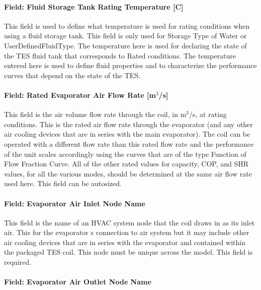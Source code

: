 \paragraph{Field: Fluid Storage Tank Rating Temperature {[}C{]}}\label{field-fluid-storage-tank-rating-temperature-c}

This field is used to define what temperature is used for rating conditions when using a fluid storage tank. This field is only used for Storage Type of Water or UserDefinedFluidType. The temperature here is used for declaring the state of the TES fluid tank that corresponds to Rated conditions. The temperature entered here is used to define fluid properties and to characterize the performance curves that depend on the state of the TES.

\paragraph{Field: Rated Evaporator Air Flow Rate {[}m\(^{3}\)/s{]}}\label{field-rated-evaporator-air-flow-rate-m3s}

This field is the air volume flow rate through the coil, in m\(^{3}\)/s, at rating conditions. This is the rated air flow rate through the evaporator (and any other air cooling devices that are in series with the main evaporator). The coil can be operated with a different flow rate than this rated flow rate and the performance of the unit scales accordingly using the curves that are of the type Function of Flow Fraction Curve. All of the other rated values for capacity, COP, and SHR values, for all the various modes, should be determined at the same air flow rate used here. This field can be autosized.

\paragraph{Field: Evaporator Air Inlet Node Name}\label{field-evaporator-air-inlet-node-name-3}

This field is the name of an HVAC system node that the coil draws in as its inlet air. This for the evaporator s connection to air system but it may include other air cooling devices that are in series with the evaporator and contained within the packaged TES coil. This node must be unique across the model. This field is required.

\paragraph{Field: Evaporator Air Outlet Node Name}\label{field-evaporator-air-outlet-node-name-2}

